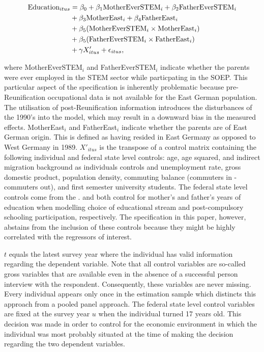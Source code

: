 \documentclass[a4paper, oneside, hyperfootnotes = false]{article}
\begin{document}
{\vspace{-8mm}

\begin{equation}
	\begin{split}
		\label{eq:specification}
		\textnormal{Education}_{itus} &={} \beta_{0} + \beta_{1}\textnormal{MotherEverSTEM}_{i} + \beta_{2}\textnormal{FatherEverSTEM}_{i} \\
		& + \beta_{3}\textnormal{MotherEast}_{i} + \beta_{4}\textnormal{FatherEast}_{i} \\
		& + \beta_{5}(\textnormal{MotherEverSTEM}_{i} \times \textnormal{MotherEast}_{i}) \\
		& + \beta_{5}(\textnormal{FatherEverSTEM}_{i} \times \textnormal{FatherEast}_{i}) \\
		& + \gamma{}X'_{itus} + \epsilon_{itus}\textnormal{,}
	\end{split}
\end{equation}

\noindent where MotherEverSTEM$_{i}$ and FatherEverSTEM$_{i}$ indicate whether the parents were ever employed in the STEM sector while particpating in the SOEP.
This particular aspect of the specification is inherently problematic because pre-Reunification occupational data is not available for the East German population.
The utilisation of post-Reunification information introduces the disturbances of the 1990's into the model, which may result in a downward bias in the measured effects.
MotherEast$_{i}$ and FatherEast$_{i}$ indicate whether the parents are of East German origin.
This is defined as having resided in East Germany as opposed to West Germany in 1989.
$X'_{itus}$ is the transpose of a control matrix containing the following individual and federal state level controls:
age, age squared, and indirect migration background as individuals controls and unemployment rate, gross domestic product, population density, commuting balance (commuters in - commuters out), and first semester university students.
The federal state level controls come from the \cite{INKAR2024}.
\cite{Sahoo2021} and \cite{Chevalier2013} both control for mother's and father's years of education when modelling choice of educational stream and post-compulsory schooling participation, respectively.
The specification in this paper, however, abstains from the inclusion of these controls because they might be highly correlated with the regressors of interest.

$t$ equals the latest survey year where the individual has valid information regarding the dependent variable.
Note that all control variables are so-called gross variables that are available even in the absence of a successful person interview with the respondent.
Consequently, these variables are never missing.
Every individual appears only once in the estimation sample which distincts this approach from a pooled panel approach.
The federal state level control variables are fixed at the survey year $u$ when the individual turned 17 years old.
This decision was made in order to control for the economic environment in which the individual was most probably situated at the time of making the decision regarding the two dependent variables.

}
\end{document}
